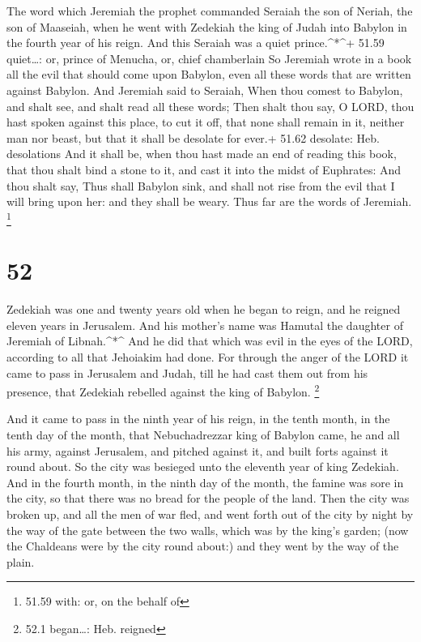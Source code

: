  The word which Jeremiah the prophet commanded Seraiah the
son of Neriah, the son of Maaseiah, when he went with Zedekiah the king
of Judah into Babylon in the fourth year of his reign. And this Seraiah
was a quiet prince.\^{}*\^{}+ 51.59 quiet\ldots: or, prince of Menucha,
or, chief chamberlain  So Jeremiah wrote in a book all the
evil that should come upon Babylon, even all these words that are
written against Babylon.  And Jeremiah said to Seraiah,
When thou comest to Babylon, and shalt see, and shalt read all these
words;  Then shalt thou say, O LORD, thou hast spoken
against this place, to cut it off, that none shall remain in it, neither
man nor beast, but that it shall be desolate for ever.+ 51.62 desolate:
Heb. desolations  And it shall be, when thou hast made an
end of reading this book, that thou shalt bind a stone to it, and cast
it into the midst of Euphrates:  And thou shalt say, Thus
shall Babylon sink, and shall not rise from the evil that I will bring
upon her: and they shall be weary. Thus far are the words of Jeremiah.
\footnote{51.59 with: or, on the behalf of}

\hypertarget{section-51}{%
\section{52}\label{section-51}}

 Zedekiah was one and twenty years old when he began to
reign, and he reigned eleven years in Jerusalem. And his mother's name
was Hamutal the daughter of Jeremiah of Libnah.\^{}*\^{} 
And he did that which was evil in the eyes of the LORD, according to all
that Jehoiakim had done.  For through the anger of the LORD
it came to pass in Jerusalem and Judah, till he had cast them out from
his presence, that Zedekiah rebelled against the king of Babylon.
\footnote{52.1 began\ldots: Heb. reigned}

 And it came to pass in the ninth year of his reign, in the
tenth month, in the tenth day of the month, that Nebuchadrezzar king of
Babylon came, he and all his army, against Jerusalem, and pitched
against it, and built forts against it round about.  So the
city was besieged unto the eleventh year of king Zedekiah. 
And in the fourth month, in the ninth day of the month, the famine was
sore in the city, so that there was no bread for the people of the land.
 Then the city was broken up, and all the men of war fled,
and went forth out of the city by night by the way of the gate between
the two walls, which was by the king's garden; (now the Chaldeans were
by the city round about:) and they went by the way of the plain.

